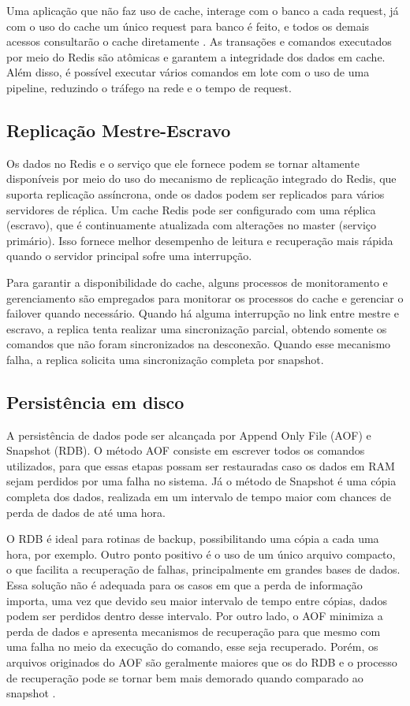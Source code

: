 \documentclass[12pt]{article}
\begin{document}
Uma aplicação que não faz uso de cache, interage com o banco a cada request, já com o uso do cache um único request para banco é feito, e todos os demais acessos consultarão o cache diretamente \cite{haber:16}. As transações e comandos executados por meio do Redis são atômicas e garantem a integridade dos dados em cache. Além disso, é possível executar vários comandos em lote com o uso de uma pipeline, reduzindo o tráfego na rede e o tempo de request. 

\subsection{Replicação Mestre-Escravo}
Os dados no Redis e o serviço que ele fornece podem se tornar altamente disponíveis por meio do uso do mecanismo de replicação integrado do Redis, que suporta replicação assíncrona, onde os dados podem ser replicados para vários servidores de réplica. Um cache Redis pode ser configurado com uma réplica (escravo), que é continuamente atualizada com alterações no master (serviço primário). Isso fornece melhor desempenho de leitura e recuperação mais rápida quando o servidor principal sofre uma interrupção.

Para garantir a disponibilidade do cache, alguns processos de monitoramento e gerenciamento são empregados para monitorar os processos do cache e gerenciar o failover quando necessário. Quando há alguma interrupção no link entre mestre e escravo, a replica tenta realizar uma sincronização parcial, obtendo somente os comandos que não foram sincronizados na desconexão. Quando esse mecanismo falha, a replica solicita uma sincronização completa por snapshot.

\subsection{Persistência em disco}
A persistência de dados pode ser alcançada por Append Only File (AOF) e Snapshot (RDB). O método AOF consiste em escrever todos os comandos utilizados, para que essas etapas possam ser restauradas caso os dados em RAM sejam perdidos por uma falha no sistema. Já o método de Snapshot é uma cópia completa dos dados, realizada em um intervalo de tempo maior com chances de perda de dados de até uma hora.  

O RDB é ideal para rotinas de backup, possibilitando uma cópia a cada uma hora, por exemplo. Outro ponto positivo é o uso de um único arquivo compacto,  o que facilita a recuperação de falhas, principalmente em grandes bases de dados. Essa solução não é adequada para os casos em que a perda de informação importa, uma vez que devido seu maior intervalo de tempo entre cópias, dados podem ser perdidos dentro desse intervalo. Por outro lado, o AOF minimiza a perda de dados e apresenta mecanismos de recuperação para que mesmo com uma falha no meio da execução do comando, esse seja recuperado. Porém, os arquivos originados do AOF são geralmente maiores que os do RDB e o processo de recuperação pode se tornar bem mais demorado quando comparado ao snapshot \cite{macedo:14}.
\end{document}
